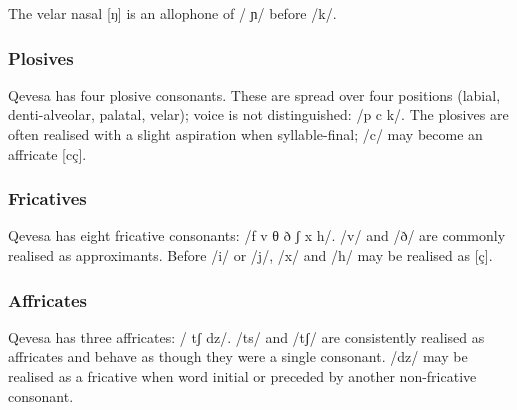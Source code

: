 \documentclass[grammar]{subfiles}
\begin{document}
  The velar nasal [ŋ] is an allophone of / ɲ/ before /k/.

  \subsubsection{Plosives}
  \label{sssec:plosives}

  Qevesa has four plosive consonants.  These are spread over four positions
  (labial, denti-alveolar, palatal, velar); voice is not distinguished: /p
   c k/.  The plosives are often realised with a slight
  aspiration when syllable-final; /c/ may become an affricate [cç].  
  

  \subsubsection{Fricatives}
  \label{sssec:fricatives}

  Qevesa has eight fricative consonants: /f v θ ð  ʃ x h/.
  /v/ and /ð/ are commonly realised as approximants. Before /i/ or /j/, /x/ and
  /h/ may be realised as [ç].
% 

  \subsubsection{Affricates}
  \label{sssec:affricates}

  Qevesa has three affricates: / tʃ dz/.
  /ts/ and /tʃ/ are consistently realised as affricates and behave as though
  they were a single consonant. /dz/ may be realised as a fricative when word
  initial or preceded by another non-fricative consonant.
\end{document}
